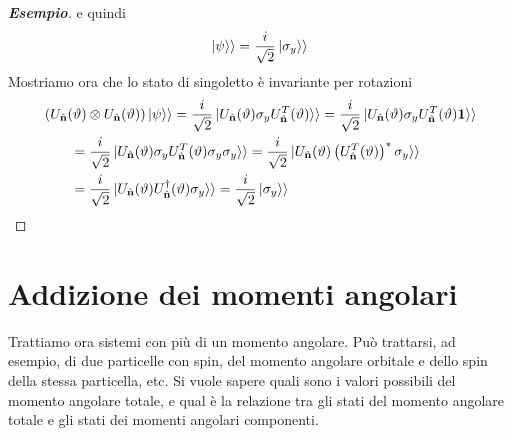 \begin{proof}[\textbf{Esempio}]
e quindi
\begin{equation}
\ket{\psi}\rangle=\frac{i}{\sqrt{2}}\ket{\sigma_y}\rangle
\end{equation}
Mostriamo ora che lo stato di singoletto è invariante per rotazioni
\begin{equation}\begin{split}
&\left(U_{\hat{\textbf{n}}}(\vartheta)\otimes U_{\hat{\textbf{n}}}(\vartheta)\right)\ket{\psi}\rangle
=\frac{i}{\sqrt{2}}\ket{U_{\hat{\textbf{n}}}(\vartheta) \sigma_y U_{\hat{\textbf{n}}}^T(\vartheta)}\rangle
=\frac{i}{\sqrt{2}}\ket{U_{\hat{\textbf{n}}}(\vartheta) \sigma_y U_{\hat{\textbf{n}}}^T(\vartheta)\textbf{1}}\rangle \\
&\qquad =\frac{i}{\sqrt{2}}\ket{U_{\hat{\textbf{n}}}(\vartheta) \sigma_y U_{\hat{\textbf{n}}}^T(\vartheta)\sigma_y\sigma_y}\rangle
=\frac{i}{\sqrt{2}}\ket{U_{\hat{\textbf{n}}}(\vartheta)\left( U_{\hat{\textbf{n}}}^T(\vartheta)\right)^*\sigma_y}\rangle \\
&\qquad =\frac{i}{\sqrt{2}}\ket{U_{\hat{\textbf{n}}}(\vartheta)U_{\hat{\textbf{n}}}^\dagger(\vartheta)\sigma_y}\rangle
=\frac{i}{\sqrt{2}}\ket{\sigma_y}\rangle
\end{split}\end{equation}
\end{proof}
 
\section{Addizione dei momenti angolari} %
Trattiamo ora sistemi con più di un momento angolare. Può trattarsi, ad esempio, di due particelle con spin, del momento angolare orbitale e dello spin della stessa particella, etc. Si vuole sapere quali sono i valori possibili del momento angolare totale, e qual è la relazione tra gli stati del momento angolare totale e gli stati dei momenti angolari componenti.

